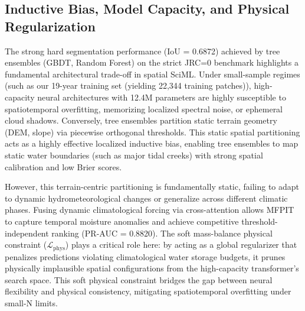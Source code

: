 \documentclass[preprint,12pt]{elsarticle}
\begin{document}
\subsection{Inductive Bias, Model Capacity, and Physical Regularization}
The strong hard segmentation performance (IoU = 0.6872) achieved by tree ensembles (GBDT, Random Forest) on the strict JRC=0 benchmark highlights a fundamental architectural trade-off in spatial SciML. Under small-sample regimes (such as our 19-year training set (yielding 22,344 training patches)), high-capacity neural architectures with 12.4M parameters are highly susceptible to spatiotemporal overfitting, memorizing localized spectral noise, or ephemeral cloud shadows. Conversely, tree ensembles partition static terrain geometry (DEM, slope) via piecewise orthogonal thresholds. This static spatial partitioning acts as a highly effective localized inductive bias, enabling tree ensembles to map static water boundaries (such as major tidal creeks) with strong spatial calibration and low Brier scores. 

However, this terrain-centric partitioning is fundamentally static, failing to adapt to dynamic hydrometeorological changes or generalize across different climatic phases. Fusing dynamic climatological forcing via cross-attention allows MFPIT to capture temporal moisture anomalies and achieve competitive threshold-independent ranking (PR-AUC = 0.8820). The soft mass-balance physical constraint ($\mathcal{L}_{\text{phys}}$) plays a critical role here: by acting as a global regularizer that penalizes predictions violating climatological water storage budgets, it prunes physically implausible spatial configurations from the high-capacity transformer's search space. This soft physical constraint bridges the gap between neural flexibility and physical consistency, mitigating spatiotemporal overfitting under small-N limits.
\end{document}
